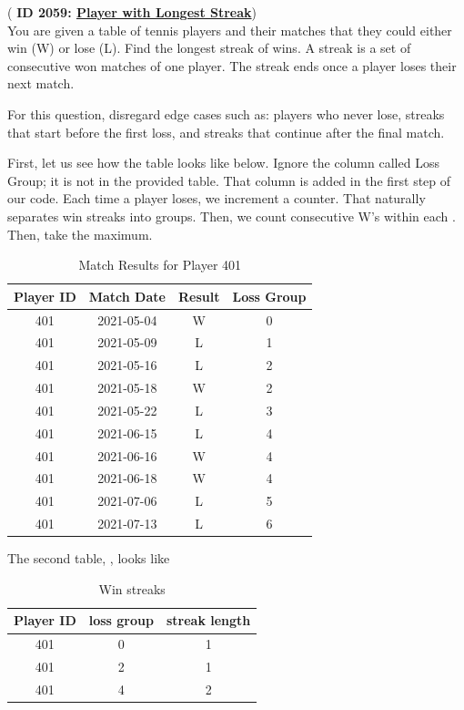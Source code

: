 \begin{exm}\label{exm:2059}
({\bf  \color{red} ID 2059: \href{https://platform.stratascratch.com/coding/2059-player-with-longest-streak?code_type=3}{Player with Longest Streak}})
\label{ex:playersLongestStreak}
\\
You are given a table of tennis players and their matches that they could either win (W) or lose (L). 
Find the longest streak of wins. A streak is a set of consecutive won matches of one player. 
The streak ends once a player loses their next match.

For this question, disregard edge cases such as: players who never lose, streaks that start before the first loss, and streaks that continue after the final match.

First, let us see how the table looks like below. Ignore the column called Loss Group; it is not
in the provided table. That column is added in the first step of our code. 
Each time a player loses, we increment a counter.
That naturally separates win streaks into groups.
Then, we count consecutive W's within each .
Then, take the maximum.
\begin{table}[h]
\centering
{}
\begin{tabular}{c|c|c|c}
\rowcolor{shadecolor} Player ID & Match Date & Result & Loss Group \\
\hline
401 & 2021-05-04 & W & 0 \\
401 & 2021-05-09 & L & 1 \\
401 & 2021-05-16 & L & 2 \\
401 & 2021-05-18 & W & 2 \\
401 & 2021-05-22 & L & 3 \\
401 & 2021-06-15 & L & 4 \\
401 & 2021-06-16 & W & 4 \\
401 & 2021-06-18 & W & 4 \\
401 & 2021-07-06 & L & 5 \\
401 & 2021-07-13 & L & 6 \\
\hline
\end{tabular}
\caption{Match Results for Player 401}
\end{table}

\vspace{.2in}
The second table, , looks like
\begin{table}[h]
\centering
{}
\begin{tabular}{c|c|c}
\rowcolor{shadecolor} Player ID & loss group & streak length \\
\hline
401 & 0 & 1\\
401 & 2 & 1\\
401 & 4 & 2\\
\hline
\end{tabular}
\caption{Win streaks}
\end{table}


\end{exm}
